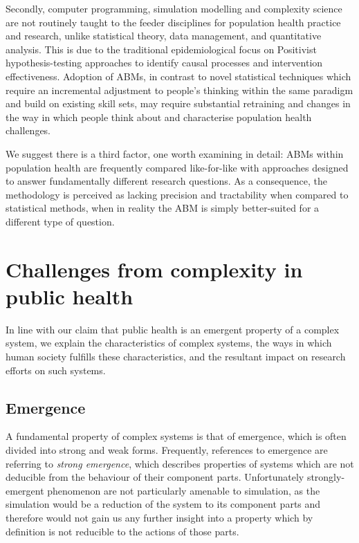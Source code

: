 \documentclass[review]{elsarticle}
\begin{document}
Secondly, computer programming, simulation modelling and complexity science are not routinely taught to the feeder disciplines for population health practice and research, unlike  statistical theory, data management, and quantitative analysis.  This is due to the traditional epidemiological focus on Positivist hypothesis-testing approaches to identify causal processes and intervention effectiveness.  Adoption of ABMs, in contrast to novel statistical techniques which require an incremental adjustment to people's thinking within the same paradigm and build on existing skill sets, may require substantial retraining and changes in the way in which people think about and characterise population health challenges.

We suggest there is a third factor, one worth examining in detail: ABMs within population health are frequently compared like-for-like with approaches designed to answer fundamentally different research questions.  As a consequence, the methodology is perceived as lacking precision and tractability when compared to statistical methods, when in reality the ABM is simply better-suited for a different type of question.

\section{Challenges from complexity in public health}

In line with our claim that public health is an emergent property of a complex system, we explain the characteristics of complex systems, the ways in which human society fulfills these characteristics, and the resultant impact on research efforts on such systems. 
 
\subsection{Emergence}
A fundamental property of complex systems is that of emergence, which is often divided into strong and weak forms.  Frequently, references to emergence are referring to \emph{strong emergence}, which describes properties of systems which are not deducible from the behaviour of their component parts. Unfortunately strongly-emergent phenomenon are not particularly amenable to simulation, as the simulation would be a reduction of the system to its component parts and therefore would not gain us any further insight into a property which by definition is not reducible to the actions of those parts.
\end{document}
